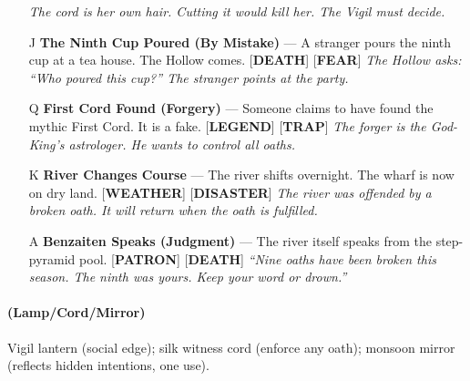 \begin{enumerate}
  \hfill \textit{The cord is her own hair. Cutting it would kill her. The Vigil must decide.}
\item[J] \textbf{The Ninth Cup Poured (By Mistake)} --- A stranger pours the ninth cup at a tea house. The Hollow comes. [\textbf{DEATH}] [\textbf{FEAR}]
  \hfill \textit{The Hollow asks: ``Who poured this cup?'' The stranger points at the party.}
\item[Q] \textbf{First Cord Found (Forgery)} --- Someone claims to have found the mythic First Cord. It is a fake. [\textbf{LEGEND}] [\textbf{TRAP}]
  \hfill \textit{The forger is the God-King's astrologer. He wants to control all oaths.}
\item[K] \textbf{River Changes Course} --- The river shifts overnight. The wharf is now on dry land. [\textbf{WEATHER}] [\textbf{DISASTER}]
  \hfill \textit{The river was offended by a broken oath. It will return when the oath is fulfilled.}
\item[A] \textbf{Benzaiten Speaks (Judgment)} --- The river itself speaks from the step-pyramid pool. [\textbf{PATRON}] [\textbf{DEATH}]
  \hfill \textit{``Nine oaths have been broken this season. The ninth was yours. Keep your word or drown.''}
\end{enumerate}

\paragraph*{(Lamp/Cord/Mirror)} Vigil lantern (social edge); silk witness cord (enforce any oath); monsoon mirror (reflects hidden intentions, one use).

